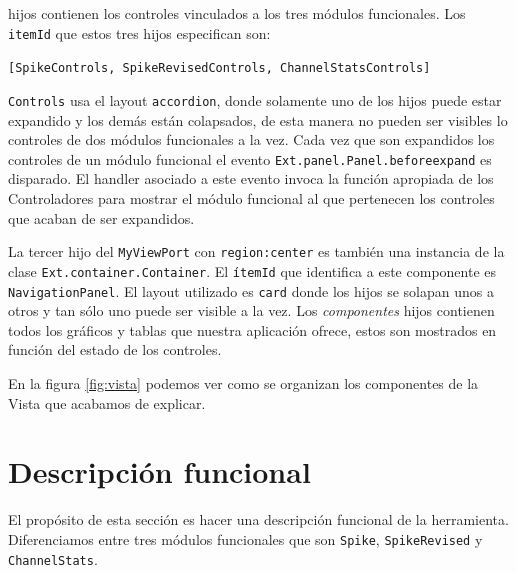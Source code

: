 	hijos contienen los controles vinculados a los tres módulos funcionales. Los \texttt{itemId} que estos tres hijos especifican son:
    		\begin{center} \texttt{[SpikeControls, SpikeRevisedControls, ChannelStatsControls]}  \end{center}
	\texttt{Controls} usa el layout \texttt{accordion}, donde solamente uno de los hijos puede estar expandido y los demás están
	colapsados, de esta manera no pueden ser visibles lo controles de dos módulos funcionales a la vez. Cada vez que son expandidos los
	controles de un módulo funcional el evento \texttt{Ext.panel.Panel.beforeexpand} es disparado. El handler asociado a este evento
	invoca la función apropiada de los Controladores para mostrar el módulo funcional al que pertenecen los controles que acaban de ser
	expandidos.
	\par
	La tercer hijo del \texttt{MyViewPort} con \texttt{region:center} es también una instancia de la clase \texttt{Ext.container.Container}. El
	\texttt{ítemId} que identifica a este componente es \texttt{NavigationPanel}. El layout utilizado es \texttt{card} donde los hijos se solapan
	unos a otros y tan sólo uno puede ser visible a la vez. Los \emph{componentes} hijos contienen todos los gráficos y tablas que nuestra
	aplicación ofrece, estos son mostrados en función del estado de los controles.
	\par
	En la figura \ref{fig:vista} podemos ver como se organizan los componentes de la Vista que acabamos de explicar.
\section{Descripción funcional}
	El propósito de esta sección es hacer una descripción funcional de la herramienta. Diferenciamos entre tres módulos funcionales que son
	\texttt{Spike}, \texttt{SpikeRevised} y \texttt{ChannelStats}.
